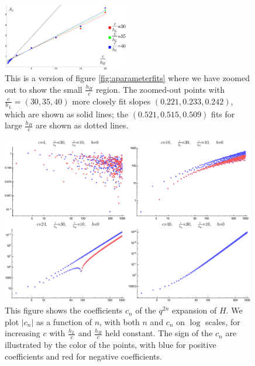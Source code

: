 \begin{subappendices}
\begin{figure}[h]
\begin{centering}
\includegraphics[width=0.49\textwidth]{virasoro_chapter/at_small_hh}
\caption[Effects of $h_L$ on the $A$ parameter for large values of $\frac{h_H}{c}$]{ This is a version of figure \ref{fig:aparameterfits} where we have zoomed out to show the small $\frac{h_H}{c}$ region. The zoomed-out points with $\frac{c}{h_L} = (30, 35, 40)$ more closely fit slopes $(0.221, 0.233, 0.242)$, which are shown as solid lines; the $(0.521, 0.515, 0.509)$ fits for large $\frac{h_H}{c}$ are shown as dotted lines.  }
\label{fig:at_large_hh}
\end{centering}
\end{figure}

\begin{figure}[h]
\begin{centering}
\includegraphics[width=0.99\textwidth]{virasoro_chapter/coeff_evolution}
\caption[Coalescing and sign-changing behavior of the $q$-expansion coefficients as a function of $c$]{ This figure shows the coefficients $c_{n}$ of the $q^{2n}$ expansion of $H$.  We plot $|c_{n}|$ as a function of $n$, with both $n$ and $c_{n}$  on $\log$ scales, for increasing $c$ with $\frac{h_L}{c}$ and $\frac{h_H}{c}$ held constant. The sign of the $c_{n}$ are illustrated by the color of the points, with blue for positive coefficients and red for negative coefficients.}
\label{fig:CoeffEvolution}
\end{centering}
\end{figure}

\end{subappendices}
